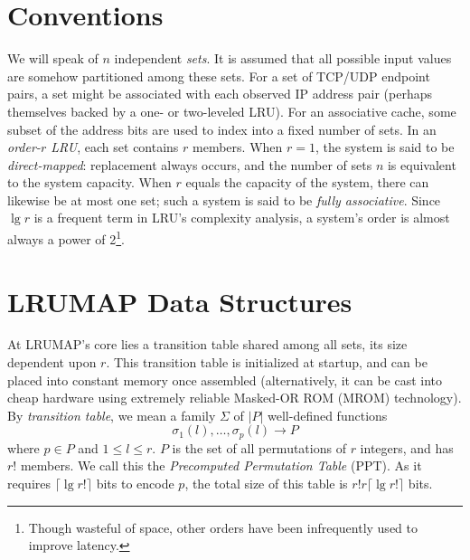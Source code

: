 \documentclass[10pt]{sigplanconf}
\begin{document}
\section{Conventions}
We will speak of $n$ independent \textit{sets}. It is assumed that all possible
input values are somehow partitioned among these sets. For a set of TCP/UDP
endpoint pairs, a set might be associated with each observed IP address pair
(perhaps themselves backed by a one- or two-leveled LRU). For an associative
cache, some subset of the address bits are used to index into a fixed number of
sets. In an \textit{order-$r$ LRU}, each set contains $r$ members. When $r=1$,
the system is said to be \textit{direct-mapped}: replacement always occurs, and
the number of sets $n$ is equivalent to the system capacity. When $r$ equals
the capacity of the system, there can likewise be at most one set; such a system
is said to be \textit{fully associative}. Since $\lg{r}$ is a frequent term in
LRU's complexity analysis, a system's order is almost always a power of 2\footnote{Though
wasteful of space, other orders have been infrequently used to improve latency\citep{intelcpuid}.}.
\section{LRUMAP Data Structures}
At LRUMAP's core lies a transition table shared among all sets, its size
dependent upon $r$. This transition table is initialized at startup, and can be
placed into constant memory once assembled (alternatively, it can be cast into
cheap hardware using extremely reliable Masked-OR ROM (MROM)
technology\citep{ice}). By \textit{transition table}, we mean a family $\Sigma$ of $|P|$
well-defined functions \begin{equation*}
\sigma_{1}(l),\dotsc,\sigma_{p}(l)\longrightarrow{P}
\end{equation*} where $p\in{P}$ and $1\le{l}\le{r}$. $P$ is the set of all
permutations of $r$ integers, and has $r!$ members. We call this the \textit{Precomputed
Permutation Table} (PPT). As it requires $\lceil\lg{r!}\rceil$
bits to encode $p$, the total size of this table is $r!r\lceil\lg{r!}\rceil$ bits.
\end{document}
